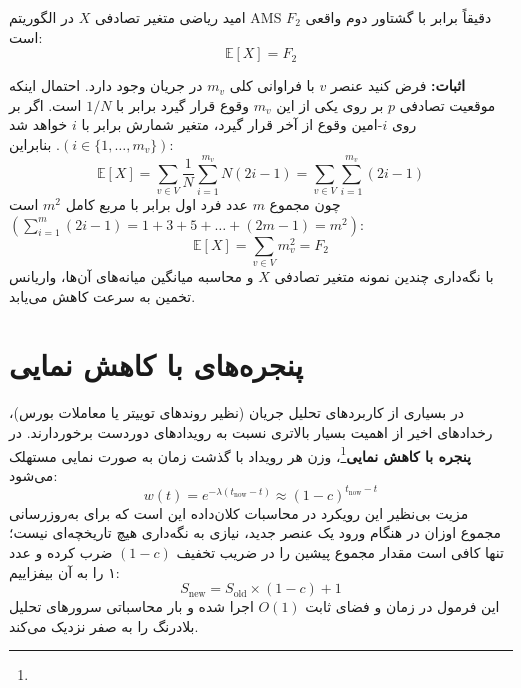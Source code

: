 \begin{theorem}
امید ریاضی متغیر تصادفی $X$ در الگوریتم AMS دقیقاً برابر با گشتاور دوم واقعی $F_2$ است:
\begin{equation}
\mathbb{E}[X] = F_2
\end{equation}
\end{theorem}
\textbf{اثبات:}
فرض کنید عنصر $v$ با فراوانی کلی $m_v$ در جریان وجود دارد. احتمال اینکه موقعیت تصادفی $p$ بر روی یکی از این $m_v$ وقوع قرار گیرد برابر با $1/N$ است. اگر بر روی $i$-امین وقوع از آخر قرار گیرد، متغیر شمارش برابر با $i$ خواهد شد $(i \in \{1, \dots, m_v\})$. بنابراین:
\begin{equation}
\mathbb{E}[X] = \sum_{v \in V} \frac{1}{N} \sum_{i=1}^{m_v} N(2i - 1) = \sum_{v \in V} \sum_{i=1}^{m_v} (2i - 1)
\end{equation}
چون مجموع $m$ عدد فرد اول برابر با مربع کامل $m^2$ است $(\sum_{i=1}^{m} (2i - 1) = 1 + 3 + 5 + \dots + (2m-1) = m^2)$:
\begin{equation}
\mathbb{E}[X] = \sum_{v \in V} m_v^2 = F_2
\end{equation}
با نگه‌داری چندین نمونه متغیر تصادفی $X$ و محاسبه میانگین میانه‌های آن‌ها، واریانس تخمین به سرعت کاهش می‌یابد.

\section{پنجره‌های با کاهش نمایی \texorpdfstring{}{(Decaying Windows)}}
در بسیاری از کاربردهای تحلیل جریان (نظیر روندهای توییتر یا معاملات بورس)، رخدادهای اخیر از اهمیت بسیار بالاتری نسبت به رویدادهای دوردست برخوردارند. در \textbf{پنجره با کاهش نمایی}\footnote{}، وزن هر رویداد با گذشت زمان به صورت نمایی مستهلک می‌شود:
\begin{equation}
w(t) = e^{-\lambda (t_{\text{now}} - t)} \approx (1 - c)^{t_{\text{now}} - t}
\end{equation}
مزیت بی‌نظیر این رویکرد در محاسبات کلان‌داده این است که برای به‌روزرسانی مجموع اوزان در هنگام ورود یک عنصر جدید، نیازی به نگه‌داری هیچ تاریخچه‌ای نیست؛ تنها کافی است مقدار مجموع پیشین را در ضریب تخفیف $(1 - c)$ ضرب کرده و عدد ۱ را به آن بیفزاییم:
\begin{equation}
S_{\text{new}} = S_{\text{old}} \times (1 - c) + 1
\end{equation}
این فرمول در زمان و فضای ثابت $O(1)$ اجرا شده و بار محاسباتی سرورهای تحلیل بلادرنگ را به صفر نزدیک می‌کند.

